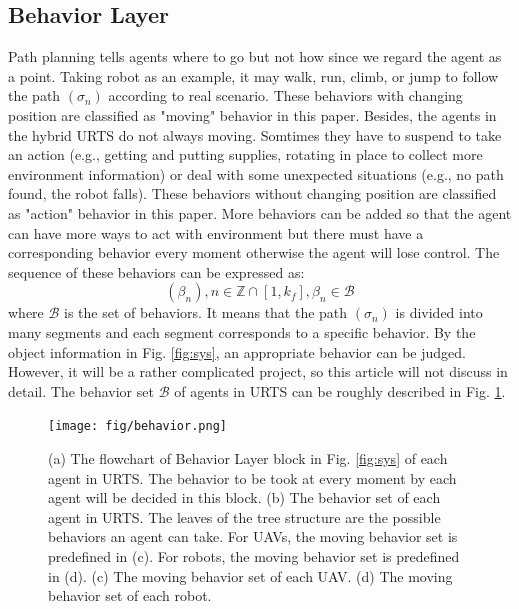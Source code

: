 \documentclass{ieeeaccess}
\begin{document}
\subsection{Behavior Layer}
Path planning tells agents where to go but not how since we regard the agent as a point. Taking robot as an example, it may walk, run, climb, or jump to follow the path $(\sigma_n)$ according to real scenario. These behaviors with changing position are classified as "moving" behavior in this paper. Besides, the agents in the hybrid URTS do not always moving. Somtimes they have to suspend to take an action (e.g., getting and putting supplies, rotating in place to collect more environment information) or deal with some unexpected situations (e.g., no path found, the robot falls). These behaviors without changing position are classified as "action" behavior in this paper. More behaviors can be added so that the agent can have more ways to act with environment but there must have a corresponding behavior every moment otherwise the agent will lose control. The sequence of these behaviors can be expressed as:
\begin{equation}
    (\beta_n), n\in\mathbb{Z}\cap[1,k_f], \beta_n\in\mathcal{B}
\end{equation}
where $\mathcal{B}$ is the set of behaviors. It means that the path $(\sigma_n)$ is divided into many segments and each segment corresponds to a specific behavior. By the object information in Fig. \ref{fig:sys}, an appropriate behavior can be judged. However, it will be a rather complicated project, so this article will not discuss in detail. The behavior set $\mathcal{B}$ of agents in URTS can be roughly described in Fig. \ref{fig:behavior}.

\begin{figure}[htbp]
    \centering
    \texttt{[image: fig/behavior.png]}\caption{
        (a) The flowchart of Behavior Layer block in Fig. \ref{fig:sys} of each agent in URTS. The behavior to be took at every moment by each agent will be decided in this block. 
        (b) The behavior set of each agent in URTS. The leaves of the tree structure are the possible behaviors an agent can take. For UAVs, the moving behavior set is predefined in (c). For robots, the moving behavior set is predefined in (d). 
        (c) The moving behavior set of each UAV. 
        (d) The moving behavior set of each robot.}%
    \label{fig:behavior}
\end{figure}
\end{document}
